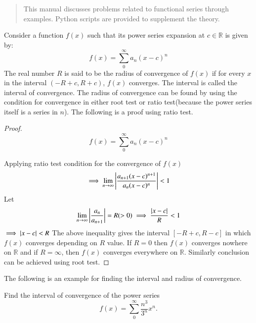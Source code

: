 \documentclass[journal,12pt,twocolumn]{IEEEtran}
\begin{document}
%
\IEEEpeerreviewmaketitle

\bigskip

\begin{abstract}
This manual discusses problems related to functional series through examples.  Python scripts are provided to supplement the theory.
\end{abstract}
%
\begin{definition}
\label{def: Interval and Radius of convergence}
Consider a function $f(x)$ such that its power series expansion at $c \in \mathbb{R}$ is given by:  
\begin{equation}
f(x)=\sum_{0}^{\infty} a_n(x-c)^n
\end{equation}
The real number $R$ is said to be the radius of convergence of $f(x)$ if for every $x$ in the interval $(-R+c,R+c)$, $f(x)$ converges. The interval is called the interval of convergence. 
The radius of convergence can be found by using the condition for convergence in either root test or ratio test(because the power series itself is a series in $n$). The following is a proof using ratio test.
\end{definition}
\begin{proof} 
\begin{equation}
f(x)=\sum_{0}^{\infty} a_n(x-c)^n
\end{equation}

Applying ratio test condition for the convergence of $f(x)$
\begin{equation}
\implies \lim_{n\to \infty}\left\vert\frac{a_{n+1}(x-c)^{n+1}}{a_n(x-c)^{n}}\right\vert< 1 
\end{equation}
Let
\begin{equation} 
\lim_{n \to \infty}\left\vert\frac{a_n}{a_{n+1}}\right\vert = R(>0)\implies \frac{\left\vert x-c\right\vert}{R} < 1  
\end{equation}
$\implies \left\vert x-c\right\vert < R$ 
The above inequality gives the interval $[-R+c,R-c]$ in which $f(x)$ converges depending on $R$ value. If $R=0$ then $f(x)$ converges nowhere on $\mathbb{R}$ and if $R=\infty$, then $f(x)$ converges everywhere on $\mathbb{R}$. Similarly conclusion can be achieved using root test.
\end{proof}
%
The following is an example for finding the interval and radius of convergence.
\begin{problem}
Find the interval of convergence of the power series
\begin{equation}
f(x)=\sum_{0}^{\infty} \frac{n^3}{3^n}x^n.
\end{equation}
\end{problem}
%
\solution
\end{document}
